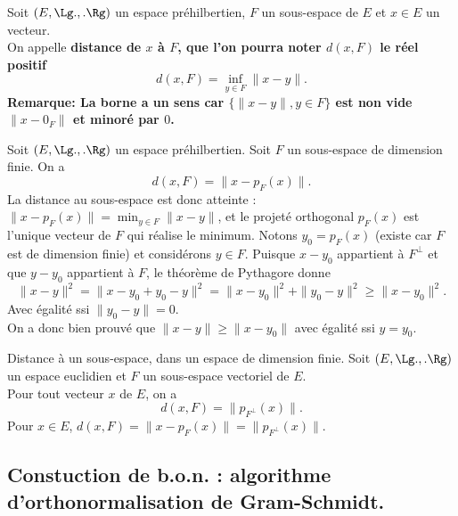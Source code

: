 \documentclass[11pt]{article}
\begin{document}
\begin{defi}{}{}
    Soit $(E,\Lg.,.\Rg)$ un espace préhilbertien, $F$ un sous-espace de $E$ et $x\in E$ un vecteur.\\
    On appelle \bf{distance} de $x$ à $F$, que l'on pourra noter $d(x,F)$ le réel positif
    \begin{equation*}
        d(x,F)=\inf_{y\in F}\|x-y\|.
    \end{equation*}
    \bf{Remarque:} La borne a un sens car $\{\|x-y\|, y\in F\}$ est non vide $\|x-0_F\|$ et minoré par $0$.
\end{defi}

\begin{prop}{}{}
    Soit $(E,\Lg.,.\Rg)$ un espace préhilbertien. Soit $F$ un sous-espace de dimension finie. On a
    \begin{equation*}
        \boxed{d(x,F)=\|x-p_F(x)\|}.
    \end{equation*}
    La distance au sous-espace est donc atteinte : $\|x-p_F(x)\|=\min_{y\in F}\|x-y\|$, et le projeté orthogonal $p_F(x)$ est l'unique vecteur de $F$ qui réalise le minimum.
    \tcblower
    Notons $y_0=p_F(x)$ (existe car $F$ est de dimension finie) et considérons $y\in F$. Puisque $x-y_0$ appartient à $F^\bot$ et que $y-y_0$ appartient à $F$, le théorème de Pythagore donne
    \begin{equation*}
        \|x-y\|^2=\|x-y_0+y_0-y\|^2=\|x-y_0\|^2+\|y_0-y\|^2\geq\|x-y_0\|^2.
    \end{equation*} 
    Avec égalité ssi $\|y_0-y\|=0$.\\
    On a donc bien prouvé que $\|x-y\|\geq\|x-y_0\|$ avec égalité ssi $y=y_0$.
\end{prop}

\begin{corr}{Distance à un sous-espace, dans un espace de dimension finie.}{}
    Soit $(E,\Lg.,.\Rg)$ un espace euclidien et $F$ un sous-espace vectoriel de $E$.\\
    Pour tout vecteur $x$ de $E$, on a
    \begin{equation*}
        d(x,F)=\|p_{F^\bot}(x)\|.
    \end{equation*}
    \tcblower
    Pour $x\in E$, $d(x,F)=\|x-p_F(x)\|=\|p_{F^\bot}(x)\|$.
\end{corr}

\subsection{Constuction de b.o.n. : algorithme d'orthonormalisation de Gram-Schmidt.}
\end{document}
